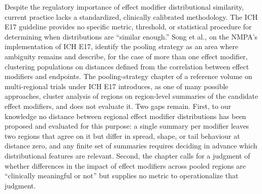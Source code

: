 \documentclass[AMA,Times1COL]{WileyNJDv5}
\begin{document}

Despite the regulatory importance of effect modifier distributional similarity, current practice lacks a standardized, clinically calibrated methodology. The ICH E17 guideline provides no specific metric, threshold, or statistical procedure for determining when distributions are ``similar enough.'' Song et al., on the NMPA's implementation of ICH E17, identify the pooling strategy as an area where ambiguity remains and describe, for the case of more than one effect modifier, clustering populations on distances defined from the correlation between effect modifiers and endpoints.\cite{song2025} The pooling-strategy chapter of a reference volume on multi-regional trials under ICH E17 introduces, as one of many possible approaches, cluster analysis of regions on region-level summaries of the candidate effect modifiers, and does not evaluate it.\cite{komiyama2024} Two gaps remain. First, to our knowledge no distance between regional effect modifier distributions has been proposed and evaluated for this purpose: a single summary per modifier leaves two regions that agree on it but differ in spread, shape, or tail behaviour at distance zero, and any finite set of summaries requires deciding in advance which distributional features are relevant. Second, the chapter calls for a judgment of whether differences in the impact of effect modifiers across pooled regions are ``clinically meaningful or not'' but supplies no metric to operationalize that judgment.
\end{document}
